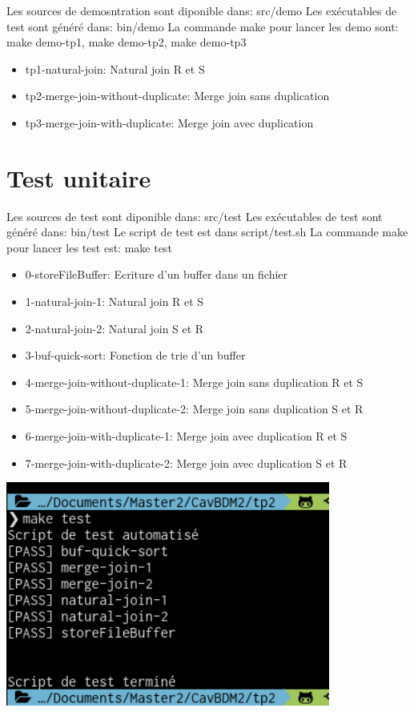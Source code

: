 \documentclass[a4paper]{article}
\begin{document}
Les sources de demosntration sont diponible dans: src/demo
Les exécutables de test sont généré dans: bin/demo
La commande make pour lancer les demo sont: make demo-tp1, make demo-tp2, make demo-tp3

\begin{itemize}
  \item tp1-natural-join: Natural join R et S
  \item tp2-merge-join-without-duplicate: Merge join sans duplication 
  \item tp3-merge-join-with-duplicate: Merge join avec duplication 
\end{itemize}

\section{Test unitaire}

Les sources de test sont diponible dans: src/test
Les exécutables de test sont généré dans: bin/test
Le script de test est dans script/test.sh
La commande make pour lancer les test est: make test

\begin{itemize}
  \item 0-storeFileBuffer: Ecriture d'un buffer dans un fichier
  \item 1-natural-join-1: Natural join R et S
  \item 2-natural-join-2: Natural join S et R
  \item 3-buf-quick-sort: Fonction de trie d'un buffer
  \item 4-merge-join-without-duplicate-1: Merge join sans duplication R et S
  \item 5-merge-join-without-duplicate-2: Merge join sans duplication S et R
  \item 6-merge-join-with-duplicate-1: Merge join avec duplication R et S
  \item 7-merge-join-with-duplicate-2: Merge join avec duplication S et R
\end{itemize}

\includegraphics[width=0.8\textwidth]{test.png}


\end{document}

